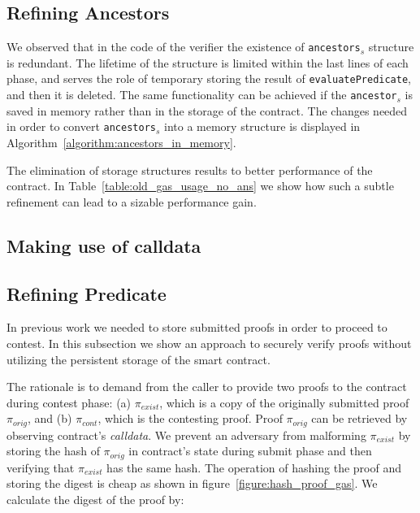

\subsection{Refining Ancestors}

We observed that in the code of the verifier the existence of
\texttt{ancestors}$_s$ structure is redundant. The lifetime of the structure is
limited within the last lines of each phase, and serves the role of temporary
storing the result of \texttt{evaluatePredicate}, and then it is deleted. The
same functionality can be achieved if the \texttt{ancestor}$_s$ is saved in
memory rather than in the storage of the contract. The changes needed in order
to convert \texttt{ancestors}$_s$ into a memory structure is displayed in
Algorithm~\ref{algorithm:ancestors_in_memory}.



The elimination of storage structures results to better performance of the
contract. In Table~\ref{table:old_gas_usage_no_ans} we show how such a subtle
refinement can lead to a sizable performance gain.



\subsection{Making use of calldata}
\subsection{Refining Predicate}

In previous work we needed to store submitted proofs in order to proceed to
contest. In this subsection we show an approach to securely verify proofs
without utilizing the persistent storage of the smart contract.

The rationale is to demand from the caller to provide two proofs to the
contract during contest phase: (a) $\pi_{exist}$, which is a copy of the
originally submitted proof $\pi_{orig}$, and (b) $\pi_{cont}$, which is the
contesting proof. Proof $\pi_{orig}$ can be retrieved by observing contract's
\textit{calldata}. We prevent an adversary from malforming $\pi_{exist}$ by
storing the hash of $\pi_{orig}$ in contract's state during submit phase and
then verifying that $\pi_{exist}$ has the same hash. The operation of hashing
the proof and storing the digest is cheap as shown in
figure~\ref{figure:hash_proof_gas}. We calculate the digest of the proof by:

